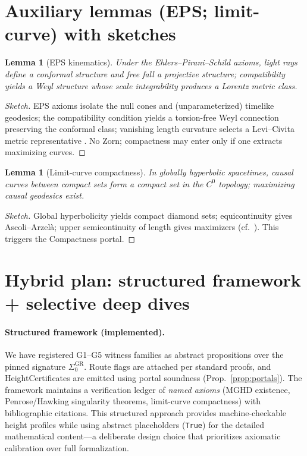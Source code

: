 \documentclass[11pt]{article}
\newtheorem{lemma}[theorem]{Lemma}
\theoremstyle{definition}
\theoremstyle{remark}
\begin{document}
\section{Auxiliary lemmas (EPS; limit-curve) with sketches}
\begin{lemma}[EPS kinematics]\label{lem:EPS}
Under the Ehlers--Pirani--Schild axioms, light rays define a conformal structure and free fall a projective structure; compatibility yields a Weyl structure whose scale integrability produces a Lorentz metric class.
\end{lemma}
\begin{proof}[Sketch]
EPS axioms isolate the null cones and (unparameterized) timelike geodesics; the compatibility condition yields a torsion-free Weyl connection preserving the conformal class; vanishing length curvature selects a Levi--Civita metric representative \cite{EPS1972}. No Zorn; compactness may enter only if one extracts maximizing curves.
\end{proof}

\begin{lemma}[Limit-curve compactness]\label{lem:limitcurve}
In globally hyperbolic spacetimes, causal curves between compact sets form a compact set in the $C^0$ topology; maximizing causal geodesics exist.
\end{lemma}
\begin{proof}[Sketch]
Global hyperbolicity yields compact diamond sets; equicontinuity gives Ascoli--Arzelà; upper semicontinuity of length gives maximizers (cf.\ \cite[§14]{Wald1984}). This triggers the Compactness portal.
\end{proof}

\section{Hybrid plan: structured framework + selective deep dives}
\paragraph{Structured framework (implemented).} We have registered G1--G5 witness families as abstract propositions over the pinned signature $\Sigma_0^{\mathrm{GR}}$. Route flags are attached per standard proofs, and HeightCertificates are emitted using portal soundness (Prop.~\ref{prop:portals}). The framework maintains a verification ledger of \emph{named axioms} (MGHD existence, Penrose/Hawking singularity theorems, limit-curve compactness) with bibliographic citations. This structured approach provides machine-checkable height profiles while using abstract placeholders (\texttt{True}) for the detailed mathematical content---a deliberate design choice that prioritizes axiomatic calibration over full formalization.
\end{document}
